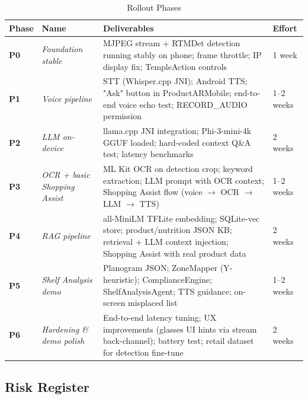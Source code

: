\documentclass[11pt,a4paper]{article}
\begin{document}
\begin{table}[h!]
\centering
\renewcommand{\arraystretch}{1.4}
\begin{tabularx}{\textwidth}{C{1.2cm} L{3.5cm} L{7cm} C{1.5cm}}
\toprule
\textbf{Phase} & \textbf{Name} & \textbf{Deliverables} & \textbf{Effort} \\
\midrule
\textbf{P0} & \textit{Foundation stable}
  & MJPEG stream + RTMDet detection running stably on phone; frame throttle; IP display fix; TempleAction controls
  & 1 week \\
\midrule
\textbf{P1} & \textit{Voice pipeline}
  & STT (Whisper.cpp JNI); Android TTS; "Ask" button in ProductARMobile; end-to-end voice echo test; RECORD\_AUDIO permission
  & 1--2 weeks \\
\midrule
\textbf{P2} & \textit{LLM on-device}
  & llama.cpp JNI integration; Phi-3-mini-4k GGUF loaded; hard-coded context Q\&A test; latency benchmarks
  & 2 weeks \\
\midrule
\textbf{P3} & \textit{OCR + basic Shopping Assist}
  & ML Kit OCR on detection crop; keyword extraction; LLM prompt with OCR context; Shopping Assist flow (voice $\rightarrow$ OCR $\rightarrow$ LLM $\rightarrow$ TTS)
  & 1--2 weeks \\
\midrule
\textbf{P4} & \textit{RAG pipeline}
  & all-MiniLM TFLite embedding; SQLite-vec store; product/nutrition JSON KB; retrieval + LLM context injection; Shopping Assist with real product data
  & 2 weeks \\
\midrule
\textbf{P5} & \textit{Shelf Analysis demo}
  & Planogram JSON; ZoneMapper (Y-heuristic); ComplianceEngine; ShelfAnalysisAgent; TTS guidance; on-screen misplaced list
  & 1--2 weeks \\
\midrule
\textbf{P6} & \textit{Hardening \& demo polish}
  & End-to-end latency tuning; UX improvements (glasses UI hints via stream back-channel); battery test; retail dataset for detection fine-tune
  & 2 weeks \\
\bottomrule
\end{tabularx}
\caption{Rollout Phases}
\end{table}

\subsection{Risk Register}
\end{document}
